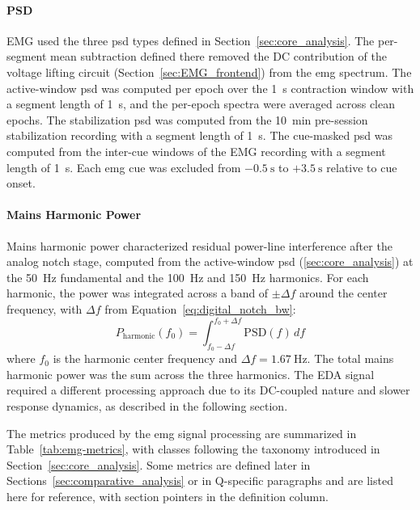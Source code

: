\paragraph{PSD} 
EMG used the three \gls{psd} types defined in Section~\ref{sec:core_analysis}. The per-segment mean subtraction defined there removed the DC contribution of the voltage lifting circuit (Section~\ref{sec:EMG_frontend}) from the \gls{emg} spectrum. The active-window \gls{psd} was computed per epoch over the \SI{1}{\second} contraction window with a segment length of \SI{1}{\second}, and the per-epoch spectra were averaged across clean epochs. The stabilization \gls{psd} was computed from the \SI{10}{\minute} pre-session stabilization recording with a segment length of \SI{1}{\second}. The cue-masked \gls{psd} was computed from the inter-cue windows of the EMG recording with a segment length of \SI{1}{\second}. Each \gls{emg} cue was excluded from $-\SI{0.5}{\second}$ to $+\SI{3.5}{\second}$ relative to cue onset. 

\paragraph{Mains Harmonic Power}
Mains harmonic power characterized residual power-line interference after the analog notch stage, computed from the active-window \gls{psd} (\autoref{sec:core_analysis}) at the \SI{50}{\hertz} fundamental and the \SI{100}{\hertz} and \SI{150}{\hertz} harmonics. For each harmonic, the power was integrated across a band of $\pm\Delta f$ around the center frequency, with $\Delta f$ from Equation~\ref{eq:digital_notch_bw}:
\begin{equation}
    P_\text{harmonic}(f_0) = \int_{f_0 - \Delta f}^{f_0 + \Delta f} \text{PSD}(f)\, df
     \label{eq:harmonic_power}
\end{equation}
where $f_0$ is the harmonic center frequency and $\Delta f = \SI{1.67}{\hertz}$. The total mains harmonic power was the sum across the three harmonics. The EDA signal required a different processing approach due to its DC-coupled nature and slower response dynamics, as described in the following section.

The metrics produced by the \gls{emg} signal processing are summarized in Table~\ref{tab:emg-metrics}, with classes following the taxonomy introduced in Section~\ref{sec:core_analysis}. Some metrics are defined later in Sections~\ref{sec:comparative_analysis} or in Q-specific paragraphs and are listed here for reference, with section pointers in the definition column.


